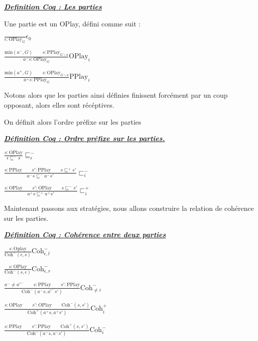 \documentclass[a4paper,12ptCOUCOU
]{article}
\newlength{\mydepth}
\newlength{\myheight}
\newenvironment{answer}
{\par\begin{lrbox}{\mybox}\quad\begin{minipage}{\linewidth}\color{black}\setlength{\parskip}{10pt plus 1pt minus 1pt}\vspace*{-.7\baselineskip}}
{\end{minipage}\end{lrbox}
\settodepth{\mydepth}{\usebox{\mybox}}
\settoheight{\myheight}{\usebox{\mybox}}
\addtolength{\myheight}{\mydepth}
\noindent\makebox[0pt]{
  \color{gray}\hspace{-0pt}\rule[-\mydepth]{1pt}{\myheight}}
\usebox{\mybox}
  }
\begin{document}
\vspace{0.4cm}\begin{minipage}{\linewidth}\textbf{\textit{\underline{ Definition Coq : Les parties }}} \begin{answer}
Une partie est un OPlay, défini comme suit :

$\frac{}{\epsilon : \text{OPlay}_G}\epsilon_0$

$\frac{\text{min}(a^-,G) \qquad s : \text{PPlay}_{G\backslash a}}
{a^-s : \text{OPlay}_G}\text{OPlay}_i$

$\frac{\text{min}(a^+,G) \qquad s : \text{OPlay}_{G\backslash a}}
{a^+s : \text{PPlay}_G}\text{PPlay}_i$
\end{answer}\end{minipage}

Notons alors que les parties ainsi définies finissent forcément par un coup
opposant, alors elles sont récéptives.


On définit alors l'ordre préfixe sur les parties

\vspace{0.4cm}\begin{minipage}{\linewidth}\textbf{\textit{\underline{ Définition Coq : Ordre préfixe sur les parties. }}} \begin{answer}
$\frac{s : \text{OPlay}}{\epsilon \sqsubseteq^- s} \sqsubseteq^-_\epsilon$

$\frac{s : \text{PPlay} \qquad s' : \text{PPlay} \qquad s \sqsubseteq^+ s'}
{a^-s \sqsubseteq^- a^-s'} \sqsubset^-_i$

$\frac{s : \text{OPlay} \qquad s' : \text{OPlay} \qquad s \sqsubseteq^- s'}
{a^+s \sqsubseteq^+ a^+s'} \sqsubset^+_i$
\end{answer}\end{minipage}


Maintenant passons aux stratégies, nous allons construire la relation de
cohérence sur les parties.

\vspace{0.4cm}\begin{minipage}{\linewidth}\textbf{\textit{\underline{ Définition Coq : Cohérence entre deux parties }}} \begin{answer}

$\frac{s:\text{Oplay}}{\text{Coh}^-(\epsilon,s)} \text{Coh}^-_{\epsilon,l}$

$\frac{s:\text{OPlay}}{\text{Coh}^-(s,\epsilon)} \text{Coh}^-_{\epsilon,r}$

$\frac{a^- \neq a'^- \qquad s:\text{PPlay} \qquad s':\text{PPlay}}
{\text{Coh}^-(a^-s, a'^- s')} \text{Coh}^-_{\neq i}$

$\frac{s : \text{OPlay} \qquad s':\text{OPlay} \qquad \text{Coh}^-(s,s')}
{\text{Coh}^+(a^+s, a^+s')} \text{Coh}^+_i$

$\frac{s : \text{PPlay} \qquad s':\text{PPlay} \qquad \text{Coh}^+(s,s')}
{\text{Coh}^-(a^-s, a^-s')} \text{Coh}^-_i$

\end{answer}\end{minipage}
\end{document}

